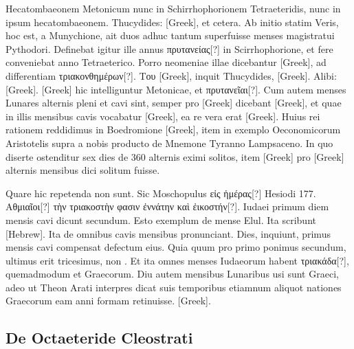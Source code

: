Hecatombaeonem Metonicum nunc in Schirrhophorionem Tetraeteridis,
nunc in ipsum hecatombaeonem.
Thucydides: \textgreek{[Greek]}, et cetera.
Ab initio statim
Veris, hoc est, a Munychione, ait duos adhuc tantum superfuisse
menses magistratui Pythodori.
Definebat igitur ille annus \textgreek{πρυτανείας[?]}
in Scirrhophorione, et fere conveniebat anno Tetraeterico.
Porro neomeniae
illae dicebantur \textgreek{[Greek]}, ad differentiam
 \textgreek{τριακονθημέρων[?]}.
\textgreek{Του [Greek]}, inquit Thucydides, \textgreek{[Greek]}.
Alibi:
\textgreek{[Greek]}.
\textgreek{[Greek]} hic intelliguntur Metonicae, et
 \textgreek{πρυτανεῖαι[?]}.
Cum autem menses Lunares alternis pleni et cavi sint, semper pro
\textgreek{[Greek]} dicebant \textgreek{[Greek]},
 et quae in illis mensibus cavis
vocabatur \textgreek{[Greek]}, ea re vera erat \textgreek{[Greek]}.
Huius rei rationem
reddidimus in Boedromione \textgreek{[Greek]}, item in exemplo
Oeconomicorum Aristotelis supra a nobis producto de Mnemone
Tyranno Lampsaceno.
In quo diserte ostenditur sex dies de 360 alternis
eximi solitos, item \textgreek{[Greek]} pro
 \textgreek{[Greek]} alternis mensibus
dici solitum fuisse.

Quare hic repetenda non sunt.
Sic Moschopulus
\textgreek{εἰς ἡμέρας[?]} Hesiodi 177.
\textgreek{Αθμιαῖοι[?] τὴν τριακοστὴν φασιν ἐννάτην καὶ ἐικοστήν[?]}.
Iudaei primum diem mensis cavi dicunt secundum.
Esto exemplum
de mense Elul.
Ita scribunt \texthebrew{[Hebrew]}.
Ita de
omnibus cavis mensibus pronunciant.
Dies, inquiunt, primus mensis
cavi compensat defectum eius.
Quia quum pro primo ponimus secundum,
ultimus erit tricesimus, non .
Et ita omnes menses Iudaeorum
habent \textgreek{τριακάδα[?]}, quemadmodum et Graecorum.
Diu autem
mensibus Lunaribus usi sunt Graeci, adeo ut Theon Arati interpres
dicat suis temporibus etiamnum aliquot nationes Graecorum eam anni
formam retinuisse.
\textgreek{[Greek]}.

\subsection{De Octaeteride Cleostrati}

